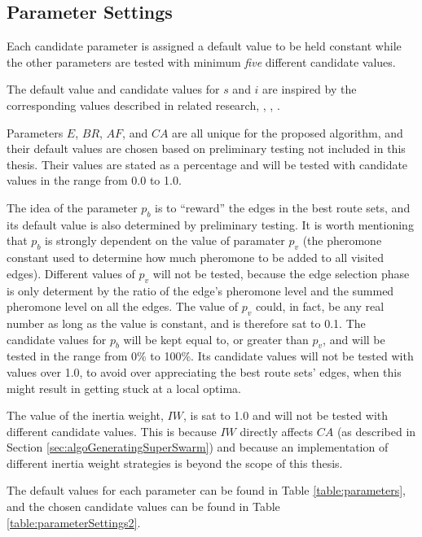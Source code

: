 \subsection{Parameter Settings}
\label{subsec:parameterSettings_setup}
Each candidate parameter is assigned a default value to be held constant while the other parameters are tested with minimum \textit{five} different candidate values. 

The default value and candidate values for $s$ and $i$ are inspired by the corresponding values described in related research\citep{salehi-nezhad07}, \citep{poorzahedy11}, \citep{sedighpour14}, \citep{kechagiopoulos14}.

Parameters $E$, $BR$, $AF$, and $CA$ are all unique for the proposed algorithm, and their default values are chosen based on preliminary testing not included in this thesis. Their values are stated as a percentage and will be tested with candidate values in the range from 0.0 to 1.0. %

The idea of the parameter $p_b$ is to ``reward'' the edges in the best route sets, and its default value is also determined by preliminary testing. It is worth mentioning that $p_ b$ is strongly dependent on the value of paramater $p_v$ (the pheromone constant used to determine how much pheromone to be added to all visited edges). Different values of $p_v$ will not be tested, because the edge selection phase is only determent by the ratio of the edge's pheromone level and the summed pheromone level on all the edges. The value of $p_v$ could, in fact, be any real number as long as the value is constant, and is therefore sat to 0.1. The candidate values for $p_b$ will be kept equal to, or greater than $p_v$, and will be tested in the range from 0\% to 100\%. Its candidate values will not be tested with values over 1.0, to avoid over appreciating the best route sets' edges, when this might result in getting stuck at a local optima.

The value of the inertia weight, $IW$, is sat to 1.0 and will not be tested with different candidate values. This is because $IW$ directly affects $CA$ (as described in Section \vref{sec:algoGeneratingSuperSwarm}) and because an implementation of different inertia weight strategies is beyond the scope of this thesis. 

The default values for each parameter can be found in Table \vref{table:parameters}, and the chosen candidate values can be found in Table \vref{table:parameterSettings2}.

